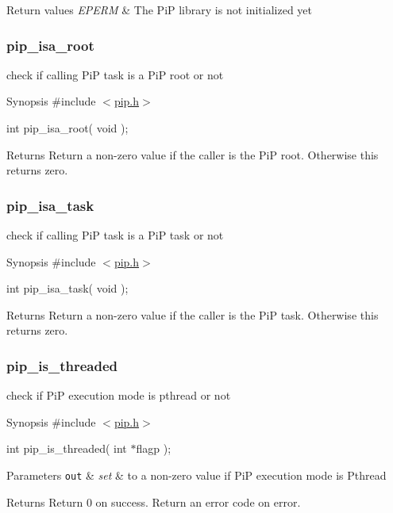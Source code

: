 \begin{DoxyRetVals}{Return values}
{\em E\-P\-E\-R\-M} & The Pi\-P library is not initialized yet \\
\hline
\end{DoxyRetVals}
\hypertarget{pip_isa_root}{}\subsubsection{pip\-\_\-isa\-\_\-root}\label{pip_isa_root}
check if calling Pi\-P task is a Pi\-P root or not

\begin{DoxyParagraph}{Synopsis}
\#include $<$\hyperlink{pip_8h_source}{pip.\-h}$>$ \par
int pip\-\_\-isa\-\_\-root( void );
\end{DoxyParagraph}
\begin{DoxyReturn}{Returns}
Return a non-\/zero value if the caller is the Pi\-P root. Otherwise this returns zero. 
\end{DoxyReturn}
\hypertarget{pip_isa_task}{}\subsubsection{pip\-\_\-isa\-\_\-task}\label{pip_isa_task}
check if calling Pi\-P task is a Pi\-P task or not

\begin{DoxyParagraph}{Synopsis}
\#include $<$\hyperlink{pip_8h_source}{pip.\-h}$>$ \par
int pip\-\_\-isa\-\_\-task( void );
\end{DoxyParagraph}
\begin{DoxyReturn}{Returns}
Return a non-\/zero value if the caller is the Pi\-P task. Otherwise this returns zero. 
\end{DoxyReturn}
\hypertarget{pip_is_threaded}{}\subsubsection{pip\-\_\-is\-\_\-threaded}\label{pip_is_threaded}
check if Pi\-P execution mode is pthread or not

\begin{DoxyParagraph}{Synopsis}
\#include $<$\hyperlink{pip_8h_source}{pip.\-h}$>$ \par
int pip\-\_\-is\-\_\-threaded( int $\ast$flagp );
\end{DoxyParagraph}

\begin{DoxyParams}[1]{Parameters}
\mbox{\tt out}  & {\em set} & to a non-\/zero value if Pi\-P execution mode is Pthread\\
\hline
\end{DoxyParams}
\begin{DoxyReturn}{Returns}
Return 0 on success. Return an error code on error. 
\end{DoxyReturn}

